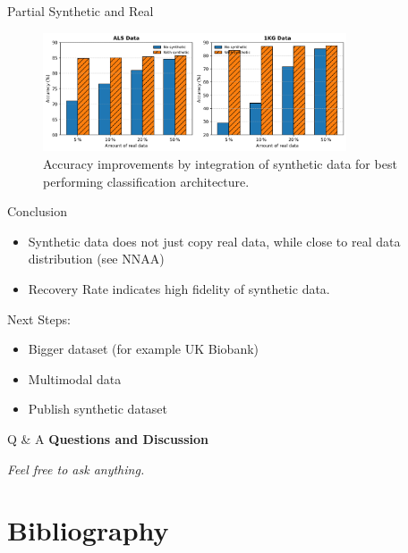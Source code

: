 \documentclass[compress, aspectratio=169]{beamer}
\begin{document}
\begin{frame}{Partial Synthetic and Real}

  \begin{figure}
    \centering
    \includegraphics[width=0.8\textwidth]{figures/synimpro.png}
    \caption{Accuracy improvements by integration of synthetic data for best performing classification architecture.}
    \label{Fig:potimprove}
  \end{figure}
    
 

\end{frame}

\begin{frame}{Conclusion}
\begin{itemize}
    \item Synthetic data does not just copy real data, while close to real data distribution (see NNAA)
    \item Recovery Rate indicates high fidelity of synthetic data.
\end{itemize}
\bigbreak
Next Steps:
\begin{itemize}
    \item Bigger dataset (for example UK Biobank)
    \item Multimodal data
    \item Publish synthetic dataset
\end{itemize}

    
\end{frame}
\begin{frame}{Q \& A}
    \textbf{Questions and Discussion}
    

    \textit{Feel free to ask anything.}
\end{frame}


\section{Bibliography}
\tiny


\end{document}
